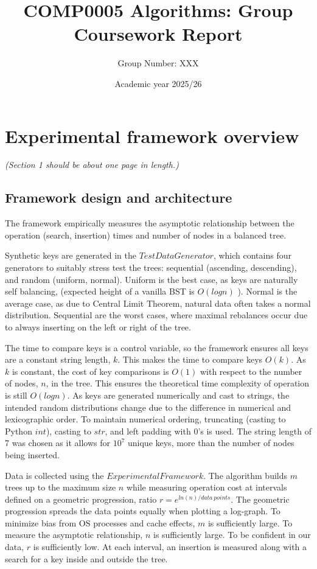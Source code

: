 \documentclass[12pt]{article}
\begin{document}
\title{COMP0005 Algorithms: Group Coursework Report}
\author{Group Number: XXX}
\date{Academic year 2025/26}
\maketitle

\section{Experimental framework overview}
\emph{(Section 1 should be about one page in length.)}

\subsection{Framework design and architecture}

The framework empirically measures the asymptotic relationship between the operation (search, insertion) times and number of nodes in a balanced tree.

Synthetic keys are generated in the $TestDataGenerator$, which contains four generators to suitably stress test the trees:
sequential (ascending, descending), and random (uniform, normal). 
Uniform is the best case, as keys are naturally self balancing, (expected height of a vanilla BST is $O(logn)$ \cite{algorithms}).
Normal is the average case, as due to Central Limit Theorem, natural data often takes a normal distribution.
Sequential are the worst cases, where maximal rebalances occur due to always inserting on the left or right of the tree.

The time to compare keys is a control variable, so the framework ensures all keys are a constant string length, $k$.
This makes the time to compare keys $O(k)$. As $k$ is constant, the cost of key comparisons is $O(1)$ with respect to the number of nodes, $n$, in the tree.
This ensures the theoretical time complexity of operation is still $O(logn)$.
As keys are generated numerically and cast to strings, the intended random distributions change due to the difference in numerical and lexicographic order.
To maintain numerical ordering, truncating (casting to Python $int$), casting to $str$, and left padding with 0's is used.
The string length of 7 was chosen as it allows for $10^7$ unique keys, more than the number of nodes being inserted.

Data is collected using the $ExperimentalFramework$. 
The algorithm builds $m$ trees up to the maximum size $n$ while measuring operation cost at intervals defined on a geometric progression, ratio $r=e^{ln(n)/data \ points}$.
The geometric progression spreads the data points equally when plotting a log-graph.
To minimize bias from OS processes and cache effects, $m$ is sufficiently large.
To measure the asymptotic relationship, $n$ is sufficiently large.
To be confident in our data, $r$ is sufficiently low.
At each interval, an insertion is measured along with a search for a key inside and outside the tree.
\end{document}
